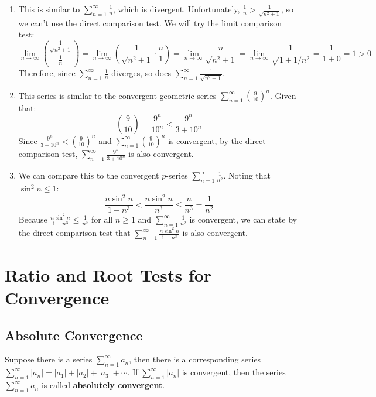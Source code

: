 \begin{Answer}[ref = comp1]
\begin{enumerate}
\item This is similar to $\sum_{n=1}^\infty \frac{1}{n}$, which is divergent. 
Unfortunately, $\frac{1}{n} > \frac{1}{\sqrt{n^2 + 1}}$, so we can't use the 
direct comparison test. We will try the limit comparison test:
$$\lim_{n \to \infty} \left( \frac{\frac{1}{\sqrt{n^2 + 1}}}{\frac{1}{n}} 
\right) = \lim_{n \to \infty} \left( \frac{1}{\sqrt{n^2 + 1}} \cdot \frac{n}{1} 
\right) = \lim_{n \to \infty} \frac{n}{\sqrt{n^2 + 1}} = \lim_{n \to \infty} 
\frac{1}{\sqrt{1 + 1/n^2}} = \frac{1}{1+ 0} = 1 > 0$$
Therefore, since $\sum_{n=1}^\infty \frac{1}{n}$ diverges, so does $\sum_
{n=1}^\infty \frac{1}{\sqrt{n^2 + 1}}$.
\item This series is similar to the convergent geometric series $\sum_{n=1}^
\infty \left( \frac{9}{10} \right)^n$. Given that:
$$\left( \frac{9}{10} \right) = \frac{9^n}{10^n} < \frac{9^n}{3 + 10^n}$$
Since $\frac{9^n}{3 + 10^n} < \left( \frac{9}{10} \right)^n$ and $\sum_{n=1}
^\infty \left( \frac{9}{10} \right)^n$ is convergent, by the direct comparison 
test, $\sum_{n=1}^\infty \frac{9^n}{3 + 10^n}$ is also convergent. 
\item We can compare this to the convergent $p$-series $\sum_{n=1}^\infty 
\frac{1}{n^2}$. Noting that $\sin^2{n} \leq 1$:
$$\frac{n \sin^2{n}}{1 + n^3} < \frac{n \sin^2{n}}{n^3} \leq \frac{n}{n^3} = 
\frac{1}{n^2}$$
Because $\frac{n \sin^2{n}}{1 + n^3} \leq \frac{1}{n^2}$ for all $n \geq 1$ 
and $\sum_{n=1}^\infty \frac{1}{n^2}$ is convergent, we can state by the 
direct comparison test that $\sum_{n=1}^\infty \frac{n \sin^2{n}}{1 + n^3}$ 
is also convergent. 
\end{enumerate}
\end{Answer}

\section{Ratio and Root Tests for Convergence}
\subsection{Absolute Convergence}
Suppose there is a series $\sum_{n=1}^\infty a_n$, 
then there is a corresponding series $\sum_{n=1}^\infty |a_n| = |a_1| + |a_2| 
+ |a_3| + \cdots$. If $\sum_{n=1}^\infty |a_n|$ is convergent, then the series 
$\sum_{n=1}^\infty a_n$ is called \textbf{absolutely convergent}. 

